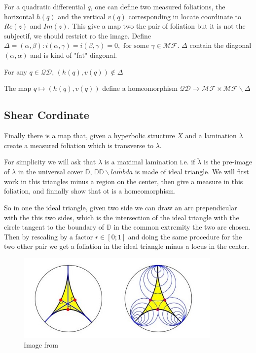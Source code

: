 For a quadratic differential $q$, one can define two measured foliations, the horizontal $h(q)$ and the vertical $v(q)$ corresponding in locate coordinate to $Re(z)$ and $Im(z)$. This give a map two the pair of foliation but it is not the subjectif, we should restrict ro the image.
Define $\Delta = {(\alpha,\beta):i(\alpha,\gamma)=i(\beta,\gamma)=0, \text{ for some }\gamma \in \mathcal{MF}}$. $\Delta$ contain the diagonal $(\alpha,\alpha)$ and is kind of "fat" diagonal.

\begin{lem}
For any $q \in \mathcal{QD}$, $(h(q),v(q)) \notin \Delta$
\end{lem}

\begin{thm}
The map $q \mapsto (h(q),v(q))$ define a homeomorphism $\mathcal{QD} \to \mathcal{MF} \times \mathcal{MF} \backslash \Delta$
\end{thm}

\subsection{Shear Cordinate}

Finally there is a map that, given a hyperbolic structure $X$ and a lamination $\lambda$ create a measured foliation which is transverse to $\lambda$.

For simplicity we will ask that $\lambda$ is a maximal lamination i.e. if $\tilde{\lambda}$ is the pre-image of $\lambda$ in the universal cover $\mathbb{D}$, $\mathbb{DD}\backslash \tilde{lambda}$ is made of ideal triangle. We will first work in this triangles minus a region on the center, then give a measure in this foliation, and finnally show that ot is a homeomorphism.

So in one the ideal triangle, given two side we can draw an arc prependicular with the this two sides, which is the intersection of the ideal triangle with the circle tangent to the boundary of $\mathbb{D}$ in the common extremity the two arc chosen. Then by rescaling by a factor $r \in [0;1]$ and doing the same procedure for the two other pair we get a foliation in the ideal triangle minus a locus in the center.


\begin{figure}[h!]
\centering
\includegraphics[width=10cm]{Image/FoliationTri.jpg}
\caption{Image from \cite{Martelli2016AnIT}}
\end{figure}

